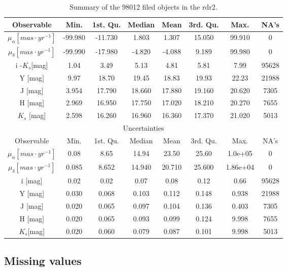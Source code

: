 \begin{table}[ht!]
\caption{Summary of the 98012 filed objects in the \gls{rdr2}.}
\begin{center}
\begin{tabular}{|c|c|c|c|c|c|c|c|}
\hline
Observable & Min. & 1st. Qu. & Median & Mean & 3rd. Qu. & Max. & NA's \\
\hline
\hline
$\mu_{\alpha} [mas\cdot yr^{-1}]$&-99.980& -11.730  & 1.803 &  1.307 & 15.050 & 99.910&0\\
$\mu_{\delta} [mas\cdot yr^{-1}]$&-99.990& -17.980  &-4.820  &-4.088   &9.189  &99.980&0\\
i -$K_s$[mag] &   1.04 &   3.49  &  5.13    &   4.81  &  5.81  &  7.99 &  95628 \\
Y [mag]          & 9.97  & 18.70      &  19.45 &  18.83 &  19.93 &  22.23  & 21988 \\
J [mag]          & 3.954 & 17.790 & 18.660 & 17.880 & 19.160 & 20.620 &   7305\\
H [mag]         & 2.969 & 16.950 & 17.750 & 17.020 & 18.210 & 20.270  &  7655\\
$K_s$ [mag] & 2.598 & 16.260 & 16.960  &16.360  &17.370 & 21.020 &   5013\\
\hline
\multicolumn{8}{c}{Uncertainties}\\
\hline
Observable & Min. & 1st. Qu. & Median &Mean& 3rd. Qu. & Max. & NA's \\
\hline
\hline
$\mu_{\alpha} [mas\cdot yr^{-1}]$&0.08  &    8.65   &  14.94   &  23.50   &  25.60 &1.0e+05&0\\ 
$\mu_{\delta} [mas\cdot yr^{-1}]$&0.085  &   8.652  &  14.940  &  20.710  &  25.600 &1.86e+04 & 0\\ 
i [mag] & 0.02        &  0.02    &    0.07 &   0.08 &  0.12   & 0.66    &    95628 \\
Y [mag] & 0.030     &   0.068&   0.103&  0.112 &   0.148&0.938  &   21988\\
J [mag] & 0.020      &  0.065  & 0.097  & 0.104 & 0.136  &0.403   & 7305\\
H [mag] & 0.020     &  0.065  & 0.093  &0.099  & 0.124  &9.998   & 7655\\
$K_s$[mag]&0.020 &  0.060 &  0.079 & 0.087  & 0.101 & 9.998  & 5013\\
\hline
\end{tabular}
\end{center}
\label{tab:rddr2_field}
\end{table}%

\subsection{Missing values}

